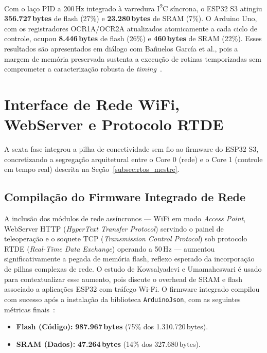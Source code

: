 Com o laço PID a 200\,Hz integrado à varredura I\textsuperscript{2}C síncrona, o ESP32 S3 atingiu \textbf{356.727\,bytes} de flash (27\%) e \textbf{23.280\,bytes} de SRAM (7\%). O Arduino Uno, com os registradores OCR1A/OCR2A atualizados atomicamente a cada ciclo de controle, ocupou \textbf{8.446\,bytes} de flash (26\%) e \textbf{460\,bytes} de SRAM (22\%). Esses resultados são apresentados em diálogo com Bañuelos García et al., pois a margem de memória preservada sustenta a execução de rotinas temporizadas sem comprometer a caracterização robusta de \textit{timing}~\cite{banuelos2026timing}.

\section{Interface de Rede WiFi, WebServer e Protocolo RTDE}
\label{sec:dev_rede}

A sexta fase integrou a pilha de conectividade sem fio ao firmware do ESP32 S3, concretizando a segregação arquitetural entre o Core 0 (rede) e o Core 1 (controle em tempo real) descrita na Seção~\ref{subsec:rtos_mestre}.

\subsection{Compilação do Firmware Integrado de Rede}
\label{subsec:dev_rede_compilacao}

A inclusão dos módulos de rede assíncronos --- WiFi em modo \textit{Access Point}, WebServer HTTP (\textit{HyperText Transfer Protocol}) servindo o painel de teleoperação e o soquete TCP (\textit{Transmission Control Protocol}) sob protocolo RTDE (\textit{Real-Time Data Exchange}) operando a 50\,Hz --- aumentou significativamente a pegada de memória flash, reflexo esperado da incorporação de pilhas complexas de rede. O estudo de Kowsalyadevi e Umamaheswari é usado para contextualizar esse aumento, pois discute o overhead de SRAM e flash associado a aplicações ESP32 com tráfego Wi-Fi. O firmware integrado compilou com sucesso após a instalação da biblioteca \texttt{ArduinoJson}, com as seguintes métricas finais~\cite{kowsalyadevi2025comprehensive}:

\begin{itemize}
    \item \textbf{Flash (Código):} \textbf{987.967\,bytes} (75\% dos 1.310.720\,bytes).
    \item \textbf{SRAM (Dados):} \textbf{47.264\,bytes} (14\% dos 327.680\,bytes).
\end{itemize}

